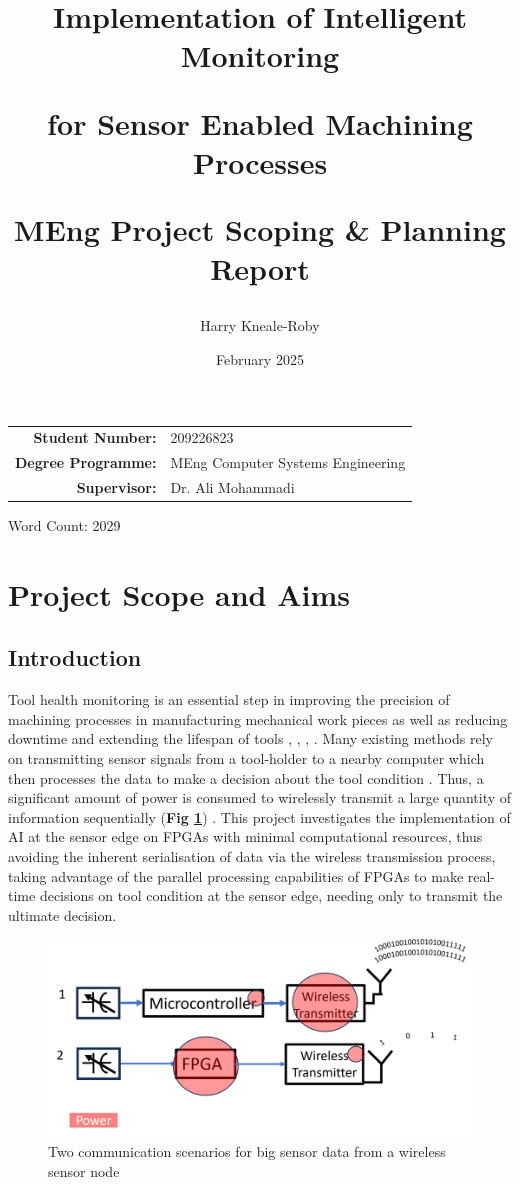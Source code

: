 \documentclass{article}
\title{
    Implementation of Intelligent Monitoring
    
    for Sensor Enabled Machining Processes
    
    \vspace{10px}
    MEng Project Scoping \& Planning Report    
}
\author{Harry Kneale-Roby}
\date{February 2025}
\begin{document}
\maketitle

\begin{table}[!ht]
    \centering
    \begin{tabular}{rl}
        \textbf{Student Number:} & 209226823 \\
        \textbf{Degree Programme:} & MEng Computer Systems Engineering\\
        \textbf{Supervisor:} & Dr. Ali Mohammadi
    \end{tabular}
\end{table}

\begin{center}
    Word Count: 2029
\end{center}
\pagebreak

\section{Project Scope and Aims}

\subsection{Introduction}
Tool health monitoring is an essential step in improving the precision of machining processes in manufacturing mechanical work pieces as well as reducing downtime and extending the lifespan of tools \cite{s22010291}, \cite{9843528}, \cite{9462147}, \cite{9529174}. Many existing methods rely on transmitting sensor signals from a tool-holder to a nearby computer which then processes the data to make a decision about the tool condition \cite{9775810}. 
Thus, a significant amount of power is consumed to wirelessly transmit a large quantity of information sequentially (\textbf{Fig \ref{fig:comm_example}}) \cite{adaline}. 
This project investigates the implementation of AI at the sensor edge on FPGAs with minimal computational resources, thus avoiding the inherent serialisation of data via the wireless transmission process, taking advantage of the parallel processing capabilities of FPGAs to make real-time decisions on tool condition at the sensor edge, needing only to transmit the ultimate decision.

\begin{figure}[!ht]
    \centering
    \includegraphics[width=0.5\linewidth]{./figures/power_diagram.png}
    \caption{Two communication scenarios for big sensor data from a wireless sensor node}
    \label{fig:comm_example}
\end{figure}
\end{document}
